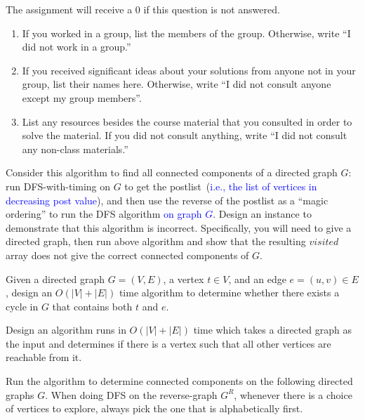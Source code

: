 \documentclass[11pt]{article}
\begin{document}
\begin{qunlist}
\setcounter{sparectr}{-1}

	The assignment will receive a 0 if this question is not answered.
\begin{enumerate}
	\item If you worked in a group, list the members of the group. Otherwise, write ``I did not work in a group.''
	\item If you received significant ideas about your solutions from anyone not in your group, list their names here. Otherwise, write ``I did not consult  anyone except my group members''.
	\item List any resources besides the course material that you consulted in order to solve the material. If you did not consult anything, write ``I did not consult any non-class materials.''
\end{enumerate}

 Consider this algorithm to find all connected components of a directed
graph $G$: run DFS-with-timing on $G$ to get the postlist~(\textcolor{blue}{i.e., the list of vertices in decreasing post value}),
and then use the reverse of the postlist as a ``magic ordering'' to run the DFS algorithm \textcolor{blue}{on graph $G$}.
Design an instance to demonstrate that this algorithm is incorrect.
Specifically, you will need to give a directed graph, then run above algorithm
and show that the resulting $visited$ array does not give the correct connected
components of $G$. 


Given a directed graph $G = (V, E)$, a vertex $t \in V$, and an edge $e = (u,v)\in E$, design
an $O(|V|+|E|)$ time algorithm to determine whether there exists a cycle in $G$ that contains both $t$ and $e$.


 Design an algorithm runs in $O(|V| + |E|)$ time which takes a directed graph as the input and determines if there is a vertex such that all other vertices are reachable from it.

 Run the algorithm to determine connected components on the following
directed graphs $G$. When doing DFS on the reverse-graph $G^R$, whenever there is a choice of
vertices to explore, always pick the one that is alphabetically first.


\end{qunlist}
\end{document}
